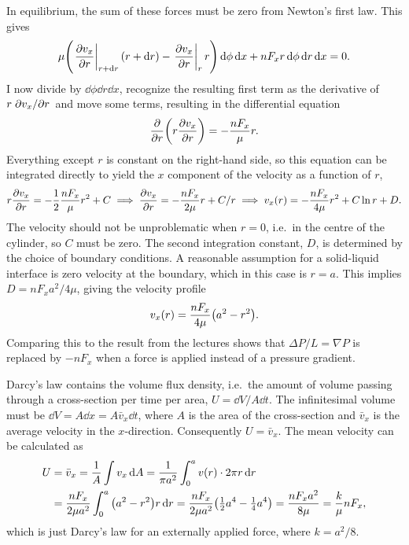 \documentclass[11pt,british,a4paper]{report}
\begin{document}
In equilibrium, the sum of these forces must be zero from Newton's first law. This gives
\begin{equation}
    \mu\qty(\eval{\pdv{v_x}{r}}_{r+\dd{r}}\qty(r+\dd{r})-\eval{\pdv{v_x}{r}}_{r}r)\dd{\phi}\dd{x} + nF_xr\dd{\phi}\dd{r}\dd{x} = 0.
\end{equation}
I now divide by \(\dd{\phi}\dd{r}\dd{x}\), recognize the resulting first term as the derivative of \(r\pdv*{v_x}{r}\) and move some terms, resulting in the differential equation
\begin{equation}
    \pdv{r}(r\pdv{v_x}{r}) = -\frac{nF_x}{\mu}r.
\end{equation}
Everything except \(r\) is constant on the right-hand side, so this equation can be integrated directly to yield the \(x\) component of the velocity as a function of \(r\),
\begin{equation}
    r\pdv{v_x}{r} = -\frac{1}{2}\frac{nF_x}{\mu}r^2 + C
    \implies \pdv{v_x}{r} = -\frac{nF_x}{2\mu}r + C/r
    \implies v_x(r) = -\frac{nF_x}{4\mu}r^2 + C\ln r + D.
\end{equation}
The velocity should not be unproblematic when \(r=0\), i.e.\ in the centre of the cylinder, so \(C\) must be zero. The second integration constant, \(D\), is determined by the choice of boundary conditions. A reasonable assumption for a solid-liquid interface is zero velocity at the boundary, which in this case is \(r=a\). This implies \(D=nF_xa^2/4\mu\), giving the velocity profile
\begin{equation}
    v_x(r) = \frac{nF_x}{4\mu}\qty(a^2-r^2).\label{eq:velprofile}
\end{equation}
Comparing this to the result from the lectures shows that \(\Delta P/L = \nabla P\) is replaced by \(-nF_x\) when a force is applied instead of a pressure gradient.

Darcy's law contains the volume flux density, i.e.\ the amount of volume passing through a cross-section per time per area, \(U=\dd{V}/A\dd{t}\). The infinitesimal volume must be \(\dd{V}=A\dd{x}=A\bar{v}_x\dd{t}\), where \(A\) is the area of the cross-section and \(\bar{v}_x\) is the average velocity in the \(x\)-direction. Consequently \(U=\bar{v}_x\). The mean velocity can be calculated as
\begin{alignat}{2}
    U &= \bar{v}_x = \frac{1}{A}\int v_x \dd{A} = \frac{1}{\pi a^2}\int_0^a v(r)\cdot 2\pi r\dd{r}\\
    &= \frac{nF_x}{2\mu a^2}\int_0^a \qty(a^2-r^2)r\dd{r}
    = \frac{nF_x}{2\mu a^2}\qty(\tfrac{1}{2}a^4-\tfrac{1}{4}a^4)
    = \frac{nF_xa^2}{8\mu} = \frac{k}{\mu} nF_x,
\end{alignat}
which is just Darcy's law for an externally applied force, where \(k=a^2/8\).
\end{document}
